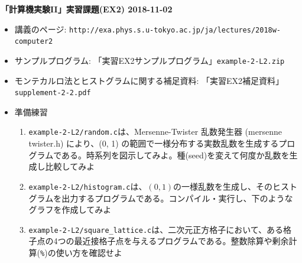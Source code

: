 \documentclass[11pt]{jarticle}
\begin{document}
\noindent
{\bf\large 「計算機実験II」実習課題(EX2) 2018-11-02}
\\[-0.5em]

\noindent
\begin{itemize}
\item 講義のページ: \verb+http://exa.phys.s.u-tokyo.ac.jp/ja/lectures/2018w-computer2+

\item サンプルプログラム: 「実習EX2サンプルプログラム」{\tt example-2-L2.zip}

\item モンテカルロ法とヒストグラムに関する補足資料: 「実習EX2補足資料」{\tt supplement-2-2.pdf}

\item 準備練習
  
\begin{enumerate}
\item {\tt example-2-L2/random.c}は、Mersenne-Twister 乱数発生器 (mersenne twister.h) により、(0, 1) の範囲で一様分布する実数乱数を生成するプログラムである。時系列を図示してみよ。種(seed)を変えて何度か乱数を生成し比較してみよ
\item {\tt example-2-L2/histogram.c}は、$(0,1)$の一様乱数を生成し、そのヒストグラムを出力するプログラムである。コンパイル・実行し、下のようなグラフを作成してみよ
  \begin{center}
  \end{center}
\item {\tt example-2-L2/square\_lattice.c}は、二次元正方格子において、ある格子点の4つの最近接格子点を与えるプログラムである。整数除算や剰余計算({\tt \%})の使い方を確認せよ
\end{enumerate}


\end{itemize}
\end{document}

